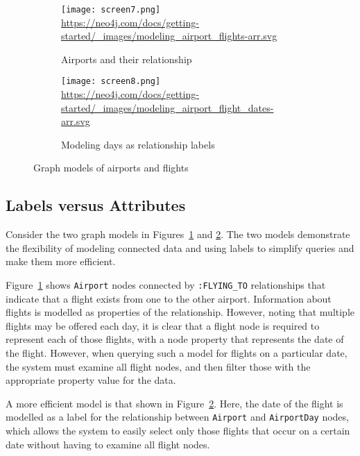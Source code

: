 \begin{figure}
\centering
\begin{subfigure}{\textwidth}
    \centering
    \texttt{[image: screen7.png]} \\
    \scriptsize{\url{https://neo4j.com/docs/getting-started/_images/modeling_airport_flights-arr.svg}}
    \caption{Airports and their relationship}
    \label{fig:flexiblegraph1}
\end{subfigure}
\hfill
\begin{subfigure}{\textwidth}
    \centering
    \texttt{[image: screen8.png]} \\
    \scriptsize{\url{https://neo4j.com/docs/getting-started/_images/modeling_airport_flight_dates-arr.svg}}
    \caption{Modeling days as relationship labels}
    \label{fig:flexiblegraph2}
\end{subfigure}
\hfill
\caption{Graph models of airports and flights}
\label{fig:airportmodels}
\end{figure}

\subsection*{Labels versus Attributes} 

Consider the two graph models in Figures~\ref{fig:flexiblegraph1} and \ref{fig:flexiblegraph2}. The two models demonstrate the flexibility of modeling connected data and using labels to simplify queries and make them more efficient.

Figure~\ref{fig:flexiblegraph1} shows \texttt{Airport} nodes connected by \texttt{:FLYING\_TO} relationships that indicate that a flight exists from one to the other airport. Information about flights is modelled as properties of the relationship. However, noting that multiple flights may be offered each day, it is clear that a flight node is required to represent each of those flights, with a node property that represents the date of the flight. However, when querying such a model for flights on a particular date, the system must examine all flight nodes, and then filter those with the appropriate property value for the data. 

A more efficient model is that shown in Figure~\ref{fig:flexiblegraph2}. Here, the date of the flight is modelled as a label for the relationship between \texttt{Airport} and \texttt{AirportDay} nodes, which allows the system to easily select only those flights that occur on a certain date without having to examine all flight nodes. 

